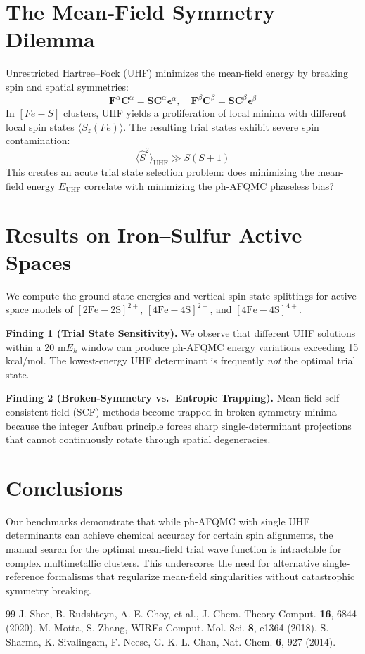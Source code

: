 \documentclass[twocolumn,10pt,letterpaper]{article}
\begin{document}
\section{The Mean-Field Symmetry Dilemma}
Unrestricted Hartree--Fock (UHF) minimizes the mean-field energy by breaking spin and spatial symmetries:
\begin{equation}
\mathbf{F}^\alpha \mathbf{C}^\alpha = \mathbf{S} \mathbf{C}^\alpha \boldsymbol{\epsilon}^\alpha, \quad \mathbf{F}^\beta \mathbf{C}^\beta = \mathbf{S} \mathbf{C}^\beta \boldsymbol{\epsilon}^\beta
\end{equation}
In $[Fe-S]$ clusters, UHF yields a proliferation of local minima with different local spin states $\langle S_z(Fe) \rangle$. The resulting trial states exhibit severe spin contamination:
\begin{equation}
\langle \hat{S}^2 \rangle_{\text{UHF}} \gg S(S + 1)
\end{equation}
This creates an acute trial state selection problem: does minimizing the mean-field energy $E_{\text{UHF}}$ correlate with minimizing the ph-AFQMC phaseless bias?

\section{Results on Iron--Sulfur Active Spaces}
We compute the ground-state energies and vertical spin-state splittings for active-space models of $[2\text{Fe}-2\text{S}]^{2+}$, $[4\text{Fe}-4\text{S}]^{2+}$, and $[4\text{Fe}-4\text{S}]^{4+}$. 

\noindent \textbf{Finding 1 (Trial State Sensitivity).} 
We observe that different UHF solutions within a 20 m$E_h$ window can produce ph-AFQMC energy variations exceeding 15 kcal/mol. The lowest-energy UHF determinant is frequently \textit{not} the optimal trial state.

\noindent \textbf{Finding 2 (Broken-Symmetry vs.\ Entropic Trapping).} 
Mean-field self-consistent-field (SCF) methods become trapped in broken-symmetry minima because the integer Aufbau principle forces sharp single-determinant projections that cannot continuously rotate through spatial degeneracies. 

\section{Conclusions}
Our benchmarks demonstrate that while ph-AFQMC with single UHF determinants can achieve chemical accuracy for certain spin alignments, the manual search for the optimal mean-field trial wave function is intractable for complex multimetallic clusters. This underscores the need for alternative single-reference formalisms that regularize mean-field singularities without catastrophic symmetry breaking.

\begin{thebibliography}{99}
 J. Shee, B. Rudshteyn, A. E. Choy, et al., J. Chem. Theory Comput. \textbf{16}, 6844 (2020).
 M. Motta, S. Zhang, WIREs Comput. Mol. Sci. \textbf{8}, e1364 (2018).
 S. Sharma, K. Sivalingam, F. Neese, G. K.-L. Chan, Nat. Chem. \textbf{6}, 927 (2014).
\end{thebibliography}
\end{document}
